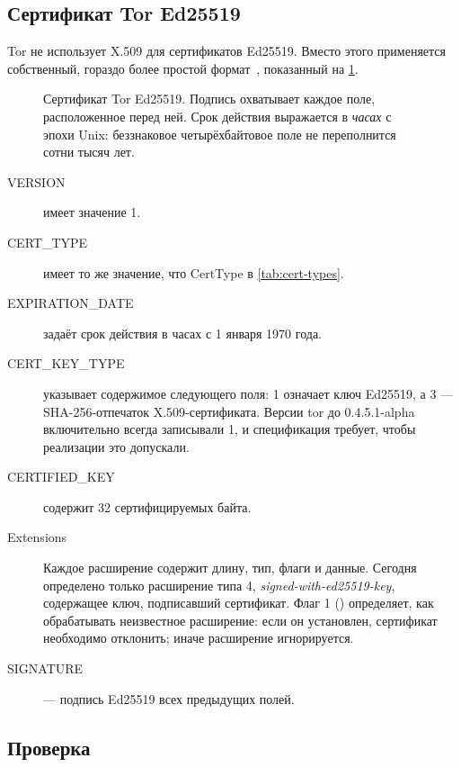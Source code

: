 \subsection{Сертификат Tor Ed25519}

Tor не использует X.509 для сертификатов Ed25519. Вместо этого применяется собственный, гораздо более простой формат~, показанный на \cref{fig:cert-ed}.

\begin{figure}[htbp]
\centering

\caption{Сертификат Tor Ed25519. Подпись охватывает каждое поле, расположенное перед ней. Срок действия выражается в \emph{часах} с эпохи Unix: беззнаковое четырёхбайтовое поле не переполнится сотни тысяч лет.}
\label{fig:cert-ed}
\end{figure}

\begin{description}
  \item[VERSION] имеет значение 1.
  \item[CERT\_TYPE] имеет то же значение, что CertType в \cref{tab:cert-types}.
  \item[EXPIRATION\_DATE] задаёт срок действия в часах с 1 января 1970 года.
  \item[CERT\_KEY\_TYPE] указывает содержимое следующего поля: 1 означает ключ Ed25519, а 3 --- SHA-256-отпечаток X.509-сертификата. Версии tor до 0.4.5.1-alpha включительно всегда записывали 1, и спецификация требует, чтобы реализации это допускали.
  \item[CERTIFIED\_KEY] содержит 32 сертифицируемых байта.
  \item[Extensions] Каждое расширение содержит длину, тип, флаги и данные. Сегодня определено только расширение типа 4, \emph{signed-with-ed25519-key}, содержащее ключ, подписавший сертификат. Флаг 1 () определяет, как обрабатывать неизвестное расширение: если он установлен, сертификат необходимо отклонить; иначе расширение игнорируется.
  \item[SIGNATURE] --- подпись Ed25519 всех предыдущих полей.
\end{description}

\subsection{Проверка}\label{sec:canale-verifica}

